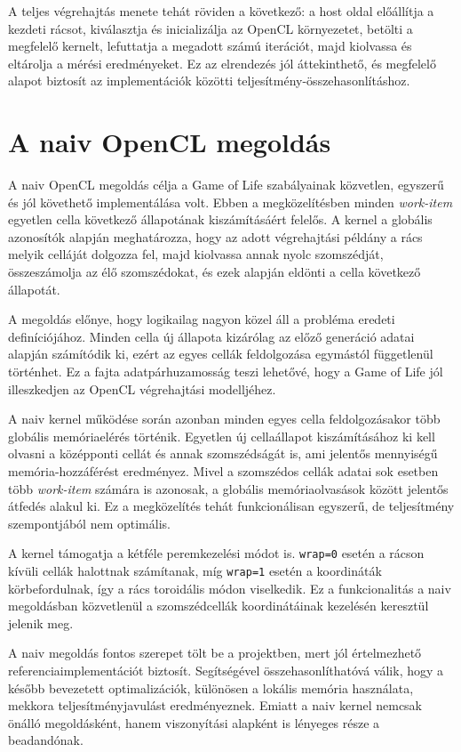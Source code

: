 \documentclass[12pt,a4paper]{article}
\begin{document}
A teljes végrehajtás menete tehát röviden a következő: a host oldal előállítja a kezdeti rácsot, kiválasztja és inicializálja az OpenCL környezetet, betölti a megfelelő kernelt, lefuttatja a megadott számú iterációt, majd kiolvassa és eltárolja a mérési eredményeket. Ez az elrendezés jól áttekinthető, és megfelelő alapot biztosít az implementációk közötti teljesítmény-összehasonlításhoz.

\section{A naiv OpenCL megoldás}

A naiv OpenCL megoldás célja a Game of Life szabályainak közvetlen, egyszerű és jól követhető implementálása volt. Ebben a megközelítésben minden \emph{work-item} egyetlen cella következő állapotának kiszámításáért felelős. A kernel a globális azonosítók alapján meghatározza, hogy az adott végrehajtási példány a rács melyik celláját dolgozza fel, majd kiolvassa annak nyolc szomszédját, összeszámolja az élő szomszédokat, és ezek alapján eldönti a cella következő állapotát.

A megoldás előnye, hogy logikailag nagyon közel áll a probléma eredeti definíciójához. Minden cella új állapota kizárólag az előző generáció adatai alapján számítódik ki, ezért az egyes cellák feldolgozása egymástól függetlenül történhet. Ez a fajta adatpárhuzamosság teszi lehetővé, hogy a Game of Life jól illeszkedjen az OpenCL végrehajtási modelljéhez.

A naiv kernel működése során azonban minden egyes cella feldolgozásakor több globális memóriaelérés történik. Egyetlen új cellaállapot kiszámításához ki kell olvasni a középponti cellát és annak szomszédságát is, ami jelentős mennyiségű memória-hozzáférést eredményez. Mivel a szomszédos cellák adatai sok esetben több \emph{work-item} számára is azonosak, a globális memóriaolvasások között jelentős átfedés alakul ki. Ez a megközelítés tehát funkcionálisan egyszerű, de teljesítmény szempontjából nem optimális.

A kernel támogatja a kétféle peremkezelési módot is. \texttt{wrap=0} esetén a rácson kívüli cellák halottnak számítanak, míg \texttt{wrap=1} esetén a koordináták körbefordulnak, így a rács toroidális módon viselkedik. Ez a funkcionalitás a naiv megoldásban közvetlenül a szomszédcellák koordinátáinak kezelésén keresztül jelenik meg.

A naiv megoldás fontos szerepet tölt be a projektben, mert jól értelmezhető referenciaimplementációt biztosít. Segítségével összehasonlíthatóvá válik, hogy a később bevezetett optimalizációk, különösen a lokális memória használata, mekkora teljesítményjavulást eredményeznek. Emiatt a naiv kernel nemcsak önálló megoldásként, hanem viszonyítási alapként is lényeges része a beadandónak.
\end{document}
